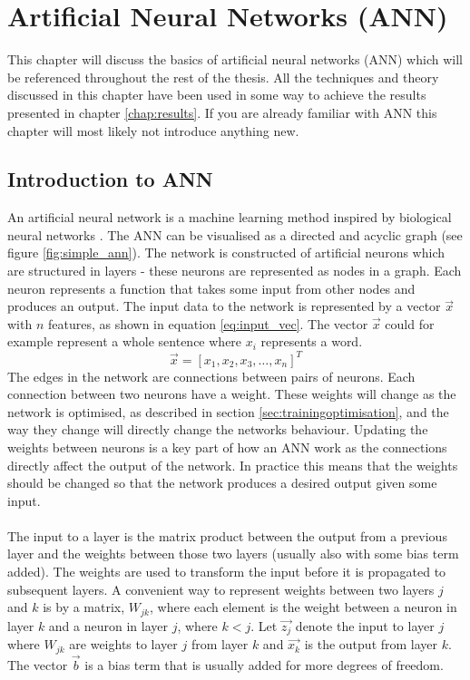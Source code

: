 \chapter{Artificial Neural Networks (ANN)}\label{chap:ann}
This chapter will discuss the basics of artificial neural networks (ANN) which will be referenced throughout the rest of the thesis. All the techniques and theory discussed in this chapter have been used in some way to achieve the results presented in chapter \ref{chap:results}. If you are already familiar with ANN this chapter will most likely not introduce anything new.

\section{Introduction to ANN}
An artificial neural network is a machine learning method inspired by biological neural networks \parencite{lippmann1987introduction}. The ANN can be visualised as a directed and acyclic graph \parencite{Goodfellow-et-al-2016} (see figure \ref{fig:simple_ann}). The network is constructed of artificial neurons which are structured in layers - these neurons are represented as nodes in a graph. Each neuron represents a function that takes some input from other nodes and produces an output. The input data to the network is represented by a vector $\vec{x}$ with $n$ features, as shown in equation \ref{eq:input_vec}. The vector $\vec{x}$ could for example represent a whole sentence where $x_i$ represents a word.
\begin{equation}\label{eq:input_vec}
    \vec{x} = [x_1, x_2, x_3, \dots , x_n]^T
\end{equation}
The edges in the network are connections between pairs of neurons. Each connection between two neurons have a weight. These weights will change as the network is optimised, as described in section \ref{sec:trainingoptimisation}, and the way they change will directly change the networks behaviour. Updating the weights between neurons is a key part of how an ANN work as the connections directly affect the output of the network. In practice this means that the weights should be changed so that the network produces a desired output given some input. 
\\\\
The input to a layer is the matrix product between the output from a previous layer and the weights between those two layers (usually also with some bias term added). The weights are used to transform the input before it is propagated to subsequent layers. A convenient way to represent weights between two layers $j$ and $k$ is by a matrix, $W_{jk}$, where each element is the weight between a neuron in layer $k$ and a neuron in layer $j$, where $k<j$. Let $\vec{z_j}$ denote the input to layer $j$ where $W_{jk}$ are weights to layer $j$ from layer $k$ and $\vec{x_k}$ is the output from layer $k$. The vector $\vec{b}$ is a bias term that is usually added for more degrees of freedom. 
